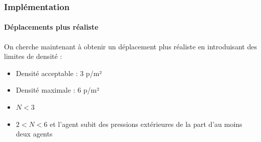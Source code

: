 \begin{frame}
\frametitle{Implémentation}
\framesubtitle{Déplacements plus réaliste}


On cherche maintenant à obtenir un déplacement plus réaliste en introduisant des limites de densité : \\

\begin{itemize}
    \item <2-> Densité acceptable : 3 p/m²
    \item <3-> Densité maximale : 6 p/m²
\end{itemize}

\bigskip
{}
\begin{itemize}
    \item <5-> $N<3$
    \item <6-> $2 <N< 6$ et l'agent subit des pressions extérieures de la part d'au moins deux agents
\end{itemize}
\end{frame}


